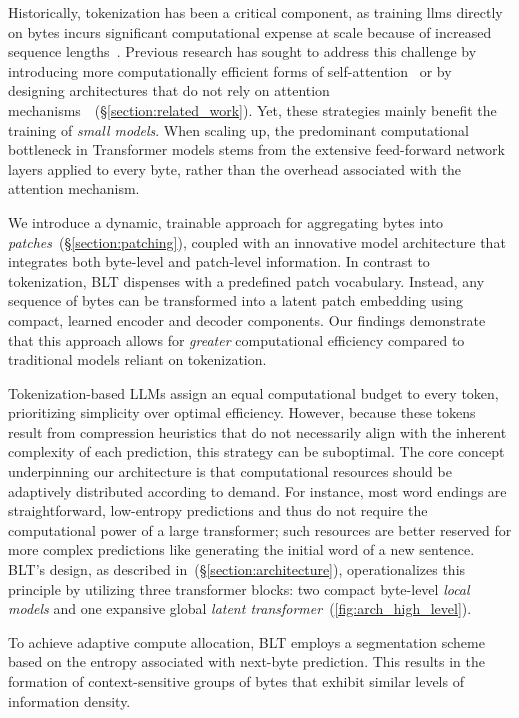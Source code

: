 Historically, tokenization has been a critical component, as training llms directly on bytes incurs significant computational expense at scale because of increased sequence lengths~\citep{xue2022byt5}. Previous research has sought to address this challenge by introducing more computationally efficient forms of self-attention~\citep{el2020characterbert, clark2022canine} or by designing architectures that do not rely on attention mechanisms~\citep{wang2024mambabyte}~(\S\ref{section:related_work}). Yet, these strategies mainly benefit the training of \textit{small models}. When scaling up, the predominant computational bottleneck in Transformer models stems from the extensive feed-forward network layers applied to every byte, rather than the overhead associated with the attention mechanism.

We introduce a dynamic, trainable approach for aggregating bytes into \textit{patches}~(\S\ref{section:patching}), coupled with an innovative model architecture that integrates both byte-level and patch-level information. In contrast to tokenization, {\textsc BLT} dispenses with a predefined patch vocabulary. Instead, any sequence of bytes can be transformed into a latent patch embedding using compact, learned encoder and decoder components. Our findings demonstrate that this approach allows for \textit{greater} computational efficiency compared to traditional models reliant on tokenization.

Tokenization-based LLMs assign an equal computational budget to every token, prioritizing simplicity over optimal efficiency. However, because these tokens result from compression heuristics that do not necessarily align with the inherent complexity of each prediction, this strategy can be suboptimal. The core concept underpinning our architecture is that computational resources should be adaptively distributed according to demand. For instance, most word endings are straightforward, low-entropy predictions and thus do not require the computational power of a large transformer; such resources are better reserved for more complex predictions like generating the initial word of a new sentence. {\textsc BLT}'s design, as described in~(\S\ref{section:architecture}), operationalizes this principle by utilizing three transformer blocks: two compact byte-level \textit{local models} and one expansive global \textit{latent transformer}~(\autoref{fig:arch_high_level}). 

To achieve adaptive compute allocation, {\textsc BLT} employs a segmentation scheme based on the entropy associated with next-byte prediction. This results in the formation of context-sensitive groups of bytes that exhibit similar levels of information density.

